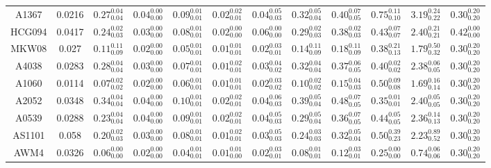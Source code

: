 \begin{table}
\begin{ruledtabular}
\begin{tabular}{c c c c c c c c c c c c}
     A1367 & 0.0216 & $0.27^{0.04}_{0.04}$ & $0.04^{0.00}_{0.00}$ & $0.09^{0.01}_{0.01}$ & $0.02^{0.02}_{0.01}$ & $0.04^{0.05}_{0.03}$ & $0.32^{0.05}_{0.04}$ & $0.40^{0.07}_{0.05}$ & $0.75^{0.11}_{0.10}$ & $3.19^{0.24}_{0.22}$ & $0.30^{0.20}_{0.20}$ \\
     HCG094 & 0.0417 & $0.24^{0.02}_{0.03}$ & $0.03^{0.00}_{0.00}$ & $0.08^{0.01}_{0.01}$ & $0.02^{0.00}_{0.00}$ & $0.06^{0.00}_{0.00}$ & $0.29^{0.02}_{0.03}$ & $0.38^{0.02}_{0.03}$ & $0.43^{0.07}_{0.07}$ & $2.40^{0.21}_{0.21}$ & $0.42^{0.00}_{0.00}$ \\
     MKW08 & 0.027 & $0.11^{0.11}_{0.09}$ & $0.02^{0.00}_{0.00}$ & $0.05^{0.01}_{0.01}$ & $0.01^{0.01}_{0.01}$ & $0.02^{0.03}_{0.01}$ & $0.14^{0.11}_{0.09}$ & $0.18^{0.11}_{0.09}$ & $0.38^{0.21}_{0.13}$ & $1.79^{0.50}_{0.32}$ & $0.30^{0.20}_{0.20}$ \\
     A4038 & 0.0283 & $0.28^{0.04}_{0.04}$ & $0.03^{0.00}_{0.00}$ & $0.07^{0.01}_{0.01}$ & $0.01^{0.02}_{0.01}$ & $0.03^{0.04}_{0.02}$ & $0.32^{0.04}_{0.04}$ & $0.37^{0.06}_{0.05}$ & $0.40^{0.02}_{0.02}$ & $2.38^{0.06}_{0.05}$ & $0.30^{0.20}_{0.20}$ \\
     A1060 & 0.0114 & $0.07^{0.02}_{0.02}$ & $0.02^{0.00}_{0.00}$ & $0.06^{0.01}_{0.01}$ & $0.01^{0.01}_{0.01}$ & $0.02^{0.03}_{0.02}$ & $0.10^{0.02}_{0.02}$ & $0.15^{0.04}_{0.03}$ & $0.50^{0.09}_{0.08}$ & $1.69^{0.16}_{0.14}$ & $0.30^{0.20}_{0.20}$ \\
     A2052 & 0.0348 & $0.34^{0.04}_{0.04}$ & $0.04^{0.00}_{0.00}$ & $0.10^{0.01}_{0.01}$ & $0.02^{0.02}_{0.01}$ & $0.04^{0.06}_{0.03}$ & $0.39^{0.05}_{0.04}$ & $0.48^{0.07}_{0.05}$ & $0.35^{0.01}_{0.01}$ & $2.40^{0.05}_{0.05}$ & $0.30^{0.20}_{0.20}$ \\
     A0539 & 0.0288 & $0.23^{0.04}_{0.04}$ & $0.04^{0.00}_{0.00}$ & $0.09^{0.01}_{0.01}$ & $0.02^{0.02}_{0.01}$ & $0.04^{0.05}_{0.03}$ & $0.29^{0.05}_{0.04}$ & $0.36^{0.07}_{0.05}$ & $0.44^{0.05}_{0.05}$ & $2.36^{0.14}_{0.13}$ & $0.30^{0.20}_{0.20}$ \\
     AS1101 & 0.058 & $0.20^{0.02}_{0.03}$ & $0.03^{0.00}_{0.00}$ & $0.08^{0.01}_{0.01}$ & $0.01^{0.02}_{0.01}$ & $0.03^{0.05}_{0.03}$ & $0.24^{0.03}_{0.03}$ & $0.32^{0.05}_{0.04}$ & $0.50^{0.39}_{0.23}$ & $2.23^{0.89}_{0.52}$ & $0.30^{0.20}_{0.20}$ \\
     AWM4 & 0.0326 & $0.06^{0.00}_{0.00}$ & $0.02^{0.00}_{0.00}$ & $0.04^{0.01}_{0.01}$ & $0.01^{0.01}_{0.00}$ & $0.02^{0.03}_{0.01}$ & $0.08^{0.01}_{0.01}$ & $0.12^{0.03}_{0.01}$ & $0.25^{0.00}_{0.00}$ & $0.74^{0.06}_{0.06}$ & $0.30^{0.20}_{0.20}$ \\

\end{tabular}
\end{ruledtabular}
\end{table}
